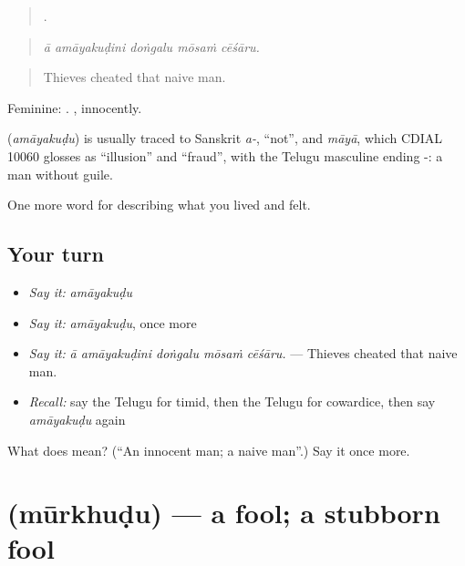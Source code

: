 \begin{quote}
    .
\end{quote}

\begin{quote}
\emph{ā amāyakuḍini doṅgalu mōsaṁ cēśāru.}
\end{quote}

\begin{quote}
Thieves cheated that naive man.
\end{quote}

Feminine: . , innocently.

\begin{cousinweb}
\textbf{} (\emph{amāyakuḍu}) is usually traced to Sanskrit \emph{a-}, \textquotedblleft{}not\textquotedblright{}, and \emph{māyā}, which CDIAL 10060 glosses as \textquotedblleft{}illusion\textquotedblright{} and \textquotedblleft{}fraud\textquotedblright{}, with the Telugu masculine ending -: a man without guile.
\end{cousinweb}

\begin{grammarlens}[title={What you've built}]
One more word for describing what you lived and felt.
\end{grammarlens}

\subsection*{Your turn}
\begin{itemize}
\raggedright
  \item \emph{Say it:} \emph{amāyakuḍu}
  \item \emph{Say it:} \emph{amāyakuḍu}, once more
  \item \emph{Say it:} \emph{ā amāyakuḍini doṅgalu mōsaṁ cēśāru.} — Thieves cheated that naive man.
  \item \emph{Recall:} say the Telugu for timid, then the Telugu for cowardice, then say \emph{amāyakuḍu} again
\end{itemize}

\begin{tcolorbox}[breakable,colback=teal!4,colframe=teal!35!black,title={Before you move on}]
What does  mean? (\textquotedblleft{}An innocent man; a naive man\textquotedblright{}.) Say it once more.
\end{tcolorbox}
\section[\texorpdfstring{\te{మూర్ఖుడు} (mūrkhuḍu)}{మూర్ఖుడు (mūrkhuḍu)}]{ (mūrkhuḍu) — a fool; a stubborn fool}

